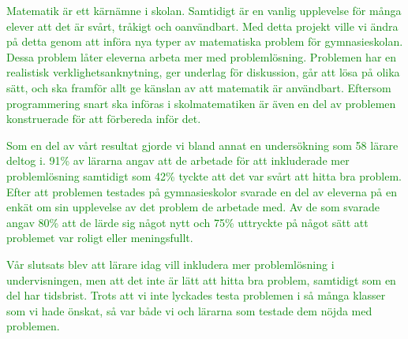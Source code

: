 \noindent \textcolor{green}{Matematik är ett kärnämne i skolan. Samtidigt är en vanlig upplevelse för många elever att det är svårt, tråkigt och oanvändbart. Med detta projekt ville vi ändra på detta genom att införa nya typer av matematiska problem för gymnasieskolan. Dessa problem låter eleverna arbeta mer med problemlösning. Problemen har en realistisk verklighetsanknytning, ger underlag för diskussion, går att lösa på olika sätt, och ska framför allt ge känslan av att matematik är användbart. Eftersom programmering snart ska införas i skolmatematiken är även en del av problemen konstruerade för att förbereda inför det.}

\textcolor{green}{Som en del av vårt resultat gjorde vi bland annat en undersökning som 58 lärare deltog i. 91\% av lärarna angav att de arbetade för att inkluderade mer problemlösning samtidigt som 42\% tyckte att det var svårt att hitta bra problem. Efter att problemen testades på gymnasieskolor svarade en del av eleverna på en enkät om sin upplevelse av det problem de arbetade med. Av de som svarade angav 80\% att de lärde sig något nytt och 75\% uttryckte på något sätt att problemet var roligt eller meningsfullt.}

\textcolor{green}{Vår slutsats blev att lärare idag vill inkludera mer problemlösning i undervisningen, men att det inte är lätt att hitta bra problem, samtidigt som en del har tidsbrist. Trots att vi inte lyckades testa problemen i så många klasser som vi hade önskat, så var både vi och lärarna som testade dem nöjda med problemen.}